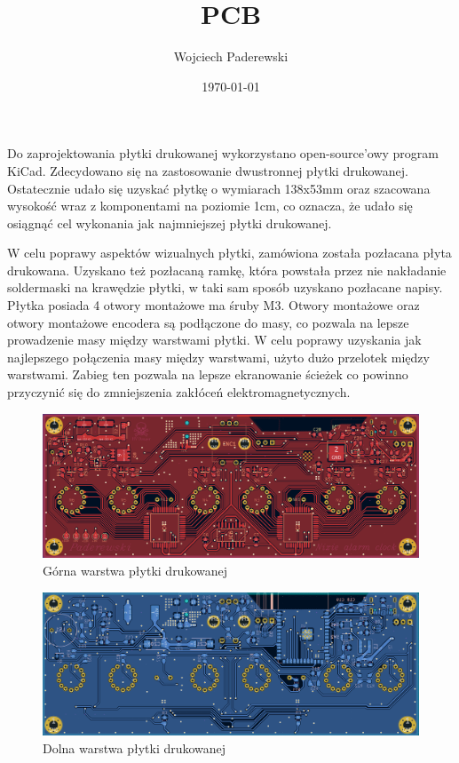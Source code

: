 \documentclass[../main.tex]{subfiles}
\author{Wojciech Paderewski}
\date{\today}
\title{PCB}
\begin{document}
Do zaprojektowania płytki drukowanej wykorzystano open-source'owy program KiCad. Zdecydowano się na zastosowanie dwustronnej płytki drukowanej.
Ostatecznie udało się uzyskać płytkę o wymiarach 138x53mm oraz szacowana wysokość wraz z komponentami na poziomie 1cm, 
co oznacza, że udało się osiągnąć cel wykonania jak najmniejszej płytki drukowanej.

W celu poprawy aspektów wizualnych płytki, zamówiona została pozłacana płyta drukowana. Uzyskano też pozłacaną ramkę, która powstała przez 
nie nakładanie soldermaski na krawędzie płytki, w taki sam sposób uzyskano pozłacane napisy. Płytka posiada 4 otwory montażowe ma śruby M3.
Otwory montażowe oraz otwory montażowe encodera są podłączone do masy, co pozwala na lepsze prowadzenie masy między warstwami płytki. W 
celu poprawy uzyskania jak najlepszego połączenia masy między warstwami, użyto dużo przelotek między warstwami. Zabieg ten pozwala na
lepsze ekranowanie ścieżek co powinno przyczynić się do zmniejszenia zakłóceń elektromagnetycznych. 

\begin{figure}[H]
    \centering
    \includegraphics[width=1\textwidth]{TOP.png}
    \caption{Górna warstwa płytki drukowanej}
\end{figure}

\begin{figure}[H]
    \centering
    \includegraphics[width=1\textwidth]{BOTTOM.png}
    \caption{Dolna warstwa płytki drukowanej}
\end{figure}
\end{document}

